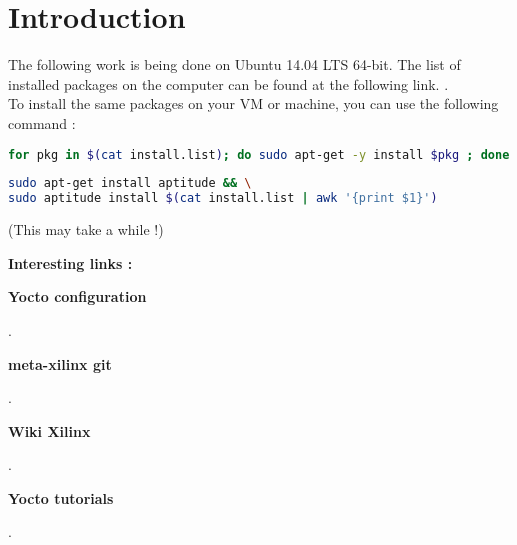 \chapter{Introduction}

The following work is being done on Ubuntu 14.04 LTS 64-bit.
The list of installed packages on the computer can be found at the following link. .
\\

To install the same packages on your VM or machine, you can use the following command :

\begin{lstlisting}[language=bash]
for pkg in $(cat install.list); do sudo apt-get -y install $pkg ; done
\end{lstlisting}

\begin{lstlisting}[language=bash]
sudo apt-get install aptitude && \
sudo aptitude install $(cat install.list | awk '{print $1}')
\end{lstlisting}

(This may take a while !)\vspace{1em}

\textbf{Interesting links  :}\vspace{1em}

\textbf{Yocto configuration}


.
\vspace{1em}

\textbf{meta-xilinx git}

. \vspace{1em}

\textbf{Wiki Xilinx}

.\vspace{1em}

\textbf{Yocto tutorials}

.
\vspace{1em}

